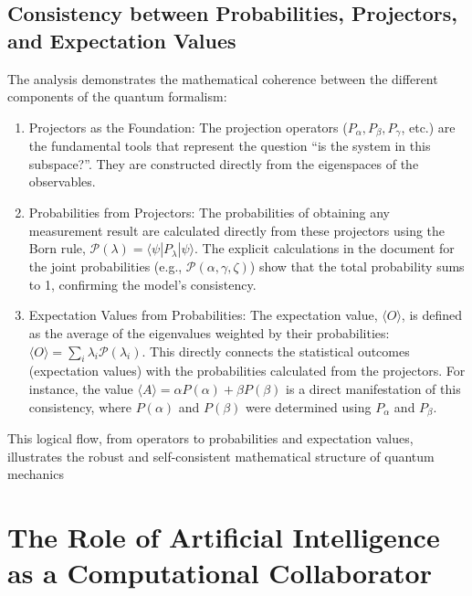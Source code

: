 \documentclass[11pt,a4paper]{article}
\begin{document}
  \subsection{Consistency between Probabilities, Projectors, and Expectation Values}
  The analysis demonstrates the mathematical coherence between the different
  components of the quantum formalism:
  \begin{enumerate}
    \item Projectors as the Foundation: The projection operators
      ($P_{\alpha}, P_{\beta}, P_{\gamma}$, etc.) are the fundamental tools that
      represent the question ``is the system in this subspace?''. They are
      constructed directly from the eigenspaces of the observables.

    \item Probabilities from Projectors: The probabilities of obtaining
      any measurement result are calculated directly from these projectors using
      the Born rule, $\mathcal{P}(\lambda) =
      \langle\psi|P_{\lambda}|\psi\rangle$. The explicit calculations in the
      document for the joint probabilities (e.g., $\mathcal{P}(\alpha, \gamma,
      \zeta)$) show that the total probability sums to 1, confirming the model's
      consistency.

    \item Expectation Values from Probabilities: The expectation value,
      $\langle O \rangle$, is defined as the average of the eigenvalues weighted
      by their probabilities: $\langle O \rangle = \sum_i \lambda_i
      \mathcal{P}(\lambda_i)$. This directly connects the statistical outcomes
      (expectation values) with the probabilities calculated from the
      projectors. For instance, the value $\langle A \rangle = \alpha P(\alpha)
      + \beta P(\beta)$ is a direct manifestation of this consistency, where
      $P(\alpha)$ and $P(\beta)$ were determined using $P_{\alpha}$ and
      $P_{\beta}$.
  \end{enumerate}
  This logical flow, from operators to probabilities and expectation values,
  illustrates the robust and self-consistent mathematical structure of quantum
  mechanics

  \section{The Role of Artificial Intelligence as a Computational Collaborator}
\end{document}
